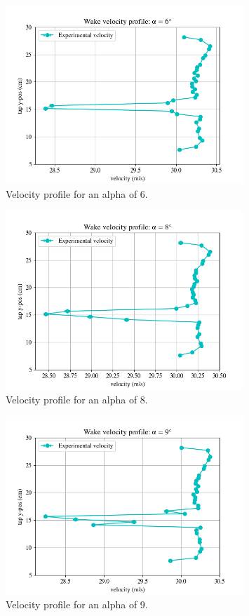 \documentclass[11pt, letterpaper]{article}
\begin{document}
\begin{appendices}
\begin{figure}[!hpt]
        \centering        
        \includegraphics[width=0.8\textwidth]{Figures/vel-graphs/vel-a6.png}
        \caption{Velocity profile for an alpha of 6\degree.}
        \label{fig:vel-a6}
\end{figure}

\begin{figure}[!hpt]
        \centering        
        \includegraphics[width=0.8\textwidth]{Figures/vel-graphs/vel-a8.png}
        \caption{Velocity profile for an alpha of 8\degree.}
        \label{fig:vel-a8}
\end{figure}

\begin{figure}[!hpt]
        \centering        
        \includegraphics[width=0.8\textwidth]{Figures/vel-graphs/vel-a9.png}
        \caption{Velocity profile for an alpha of 9\degree.}
        \label{fig:vel-a9}
\end{figure}


\end{appendices}
\end{document}
